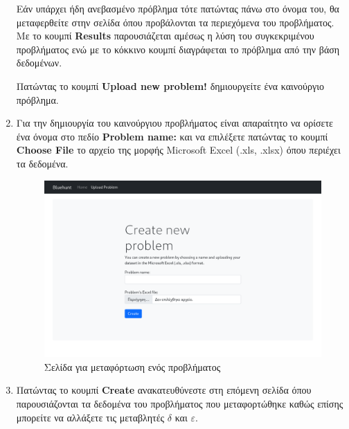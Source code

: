 \documentclass[11pt,a4paper,titlepage]{article}
\numberwithin{equation}{section}
\begin{document}
\begin{enumerate}
	Εάν υπάρχει ήδη ανεβασμένο πρόβλημα τότε πατώντας πάνω στο όνομα του, θα μεταφερθείτε στην σελίδα όπου προβάλονται τα περιεχόμενα του προβλήματος. Με το κουμπί \textbf{Results} παρουσιάζεται αμέσως η λύση του συγκεκριμένου προβλήματος ενώ με το κόκκινο κουμπί διαγράφεται το πρόβλημα από την βάση δεδομένων.
	
	Πατώντας το κουμπί \textbf{Upload new problem!} δημιουργείτε ένα καινούργιο πρόβλημα.
	
	\item Για την δημιουργία του καινούργιου προβλήματος είναι απαραίτητο να ορίσετε ένα όνομα στο πεδίο \textbf{Problem name:} και να επιλέξετε πατώντας το κουμπί \textbf{Choose File} το αρχείο της μορφής Microsoft Excel (.xls, .xlsx) όπου περιέχει τα δεδομένα.
	
	\begin{figure}[H]
		\centering
		\includegraphics[width=0.8\linewidth]{media/upload.png}
		\caption{Σελίδα για μεταφόρτωση ενός προβλήματος}
		\label{fig:uplaod}
	\end{figure}
	
	\item Πατώντας το κουμπί \textbf{Create} ανακατευθύνεστε στη επόμενη σελίδα όπου παρουσιάζονται τα δεδομένα του προβλήματος που μεταφορτώθηκε καθώς επίσης μπορείτε να αλλάξετε τις μεταβλητές $δ$ και $ε$.
	

\end{enumerate}
\end{document}

